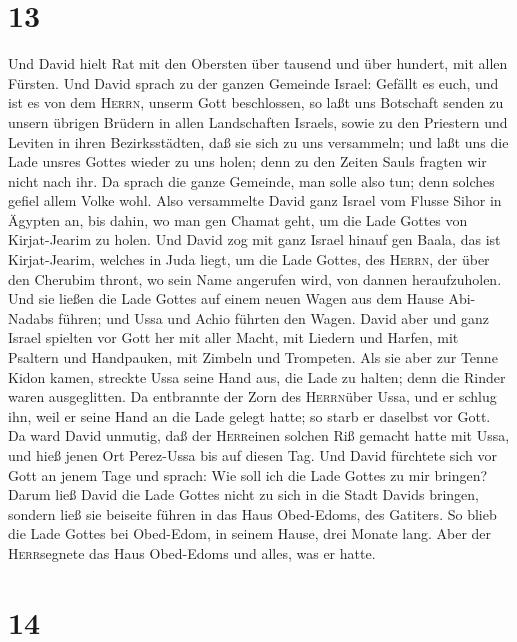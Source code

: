 \hypertarget{section-12}{%
\section{13}\label{section-12}}

 Und David hielt Rat mit den Obersten über tausend und
über hundert, mit allen Fürsten.  Und David sprach zu der
ganzen Gemeinde Israel: Gefällt es euch, und ist es von dem
\textsc{Herrn}, unserm Gott beschlossen, so laßt uns Botschaft senden zu
unsern übrigen Brüdern in allen Landschaften Israels, sowie zu den
Priestern und Leviten in ihren Bezirksstädten, daß sie sich zu uns
versammeln;  und laßt uns die Lade unsres Gottes wieder zu
uns holen; denn zu den Zeiten Sauls fragten wir nicht nach ihr.
 Da sprach die ganze Gemeinde, man solle also tun; denn
solches gefiel allem Volke wohl.  Also versammelte David
ganz Israel vom Flusse Sihor in Ägypten an, bis dahin, wo man gen Chamat
geht, um die Lade Gottes von Kirjat-Jearim zu holen.  Und
David zog mit ganz Israel hinauf gen Baala, das ist Kirjat-Jearim,
welches in Juda liegt, um die Lade Gottes, des \textsc{Herrn}, der über
den Cherubim thront, wo sein Name angerufen wird, von dannen
heraufzuholen.  Und sie ließen die Lade Gottes auf einem
neuen Wagen aus dem Hause Abi-Nadabs führen; und Ussa und Achio führten
den Wagen.  David aber und ganz Israel spielten vor Gott
her mit aller Macht, mit Liedern und Harfen, mit Psaltern und
Handpauken, mit Zimbeln und Trompeten.  Als sie aber zur
Tenne Kidon kamen, streckte Ussa seine Hand aus, die Lade zu halten;
denn die Rinder waren ausgeglitten.  Da entbrannte der
Zorn des \textsc{Herrn}über Ussa, und er schlug ihn, weil er seine Hand
an die Lade gelegt hatte; so starb er daselbst vor Gott. 
Da ward David unmutig, daß der \textsc{Herr}einen solchen Riß gemacht
hatte mit Ussa, und hieß jenen Ort Perez-Ussa bis auf diesen Tag.
 Und David fürchtete sich vor Gott an jenem Tage und
sprach: Wie soll ich die Lade Gottes zu mir bringen? 
Darum ließ David die Lade Gottes nicht zu sich in die Stadt Davids
bringen, sondern ließ sie beiseite führen in das Haus Obed-Edoms, des
Gatiters.  So blieb die Lade Gottes bei Obed-Edom, in
seinem Hause, drei Monate lang. Aber der \textsc{Herr}segnete das Haus
Obed-Edoms und alles, was er hatte.

\hypertarget{section-13}{%
\section{14}\label{section-13}}

